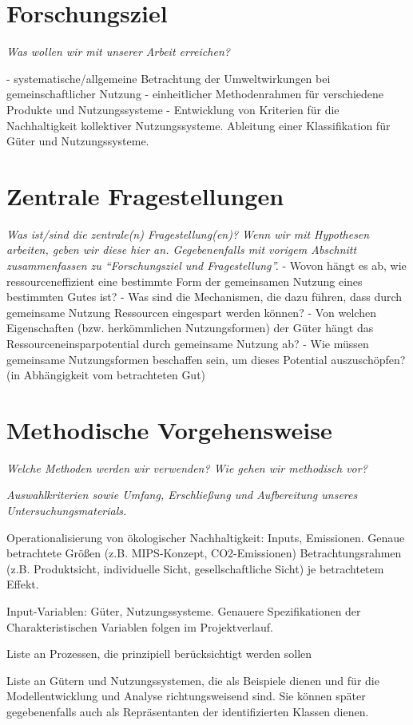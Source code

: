 \documentclass[11pt, titlepage=true]{scrartcl} %
\newcommand{\was}[1]{\small\textit{#1}}
\begin{document}
 
\section{Forschungsziel}
\was{Was wollen wir mit unserer Arbeit erreichen?}

- systematische/allgemeine Betrachtung der Umweltwirkungen bei gemeinschaftlicher Nutzung
- einheitlicher Methodenrahmen für verschiedene Produkte und Nutzungssysteme
- Entwicklung von Kriterien für die Nachhaltigkeit kollektiver Nutzungssysteme. Ableitung einer Klassifikation für Güter und Nutzungssysteme.

\section{Zentrale Fragestellungen}
\was{Was ist/sind die zentrale(n) Fragestellung(en)? Wenn wir mit Hypothesen
arbeiten, geben wir diese hier an.
Gegebenenfalls mit vorigem Abschnitt zusammenfassen zu "`Forschungsziel
und Fragestellung"'.}
- Wovon hängt es ab, wie ressourceneffizient eine bestimmte Form der gemeinsamen Nutzung eines bestimmten Gutes ist?
	- Was sind die Mechanismen, die dazu führen, dass durch gemeinsame Nutzung Ressourcen eingespart werden können?
	- Von welchen Eigenschaften (bzw. herkömmlichen Nutzungsformen) der Güter hängt das Ressourceneinsparpotential durch gemeinsame Nutzung ab?
	- Wie müssen gemeinsame Nutzungsformen beschaffen sein, um dieses Potential auszuschöpfen? (in Abhängigkeit vom betrachteten Gut)

\section{Methodische Vorgehensweise}
\was{Welche Methoden werden wir verwenden? Wie gehen wir methodisch vor?}

\was{Auswahlkriterien sowie Umfang, Erschließung und Aufbereitung unseres
Untersuchungsmaterials.}

Operationalisierung von ökologischer Nachhaltigkeit: Inputs, Emissionen. Genaue betrachtete Größen (z.B. MIPS-Konzept, CO2-Emissionen) Betrachtungsrahmen (z.B. Produktsicht, individuelle Sicht, gesellschaftliche Sicht) je betrachtetem Effekt. 

Input-Variablen: Güter, Nutzungssysteme. Genauere Spezifikationen der Charakteristischen Variablen folgen im Projektverlauf.

Liste an Prozessen, die prinzipiell berücksichtigt werden sollen

Liste an Gütern und Nutzungssystemen, die als Beispiele dienen und für die Modellentwicklung und Analyse richtungsweisend sind. Sie können später gegebenenfalls auch als Repräsentanten der identifizierten Klassen dienen.
\end{document}
